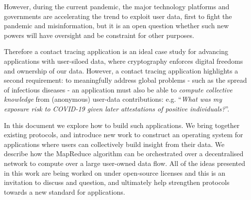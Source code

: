 \documentclass[twoside,twocolumn]{article}
\begin{document}
However, during the current pandemic, the major technology platforms and governments are accelerating the trend to exploit user data, first to fight the pandemic and misinformation, but it is an open question whether such new powers will have oversight and be constraint for other purposes.

Therefore a contact tracing application is an ideal case study for advancing applications with user-siloed data, where cryptography enforces digital freedoms and ownership of our data. However, a contact tracing application highlights a second requirement: to meaningfully address global problems - such as the spread of infectious diseases - an application must also be able to \emph{compute collective knowledge} from (anonymous) user-data contributions: e.g. ``\textit{What was my exposure risk to COVID-19 given later attestations of positive individuals?}''.

In this document we explore how to build such applications. We bring together existing protocols, and introduce new work to construct an operating system for applications where users can collectively build insight from their data. We describe how the MapReduce algorithm can be orchestrated over a decentralised network to compute over a large user-owned data flow. All of the ideas presented in this work are being worked on under open-source licenses and this is an invitation to discuss and question, and ultimately help strengthen protocols towards a new standard for applications.


%
%
%
%
%
%
\end{document}
